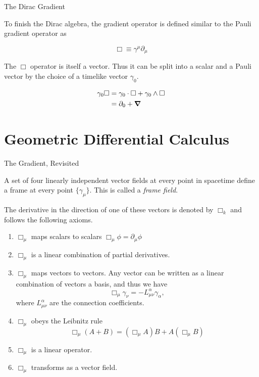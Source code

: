\documentclass{beamer}
\begin{document}
\begin{frame}{The Dirac Gradient}

To finish the Dirac algebra, the gradient operator is defined similar to the Pauli gradient operator as

\begin{equation}
	\Box \equiv \gamma^\mu\partial_\mu
\end{equation}

\pause

The $\Box$ operator is itself a vector. Thus it can be split into a scalar and a Pauli vector by the choice of a timelike vector $\gamma_0$.

\begin{align*}
	\gamma_0\Box &= \gamma_0\cdot \Box + \gamma_0 \wedge \Box \\
	&= \partial_0 + \grad
\end{align*}

\end{frame}


\section{Geometric Differential Calculus}

\begin{frame}[allowframebreaks]{The Gradient, Revisited}

A set of four linearly independent vector fields at every point in spacetime define a frame at every point $\{\gamma_\mu\}$. This is called a \emph{frame field}.

The derivative in the direction of one of these vectors is denoted by $\Box_k$ and follows the following axioms.

\begin{enumerate}
	\item $\Box_\mu$ maps scalars to scalars $\Box_\mu \phi = \partial_\mu \phi$
	\item $\Box_\mu$ is a linear combination of partial derivatives.
	\item $\Box_\mu$ maps vectors to vectors. Any vector can be written as a linear combination of vectors a basis, and thus we have
	\begin{equation*}
		\Box_\mu\gamma_\nu = -L^\alpha_{\mu\nu}\gamma_\alpha,
	\end{equation*}
	where $L^\alpha_{\mu\nu}$ are the connection coefficients.
	\item $\Box_\mu$ obeys the Leibnitz rule
	\begin{equation*}
		\Box_\mu (A+B) = (\Box_\mu A)B + A(\Box_\mu B)
	\end{equation*}
	\item $\Box_\mu$ is a linear operator.
	\item $\Box_\mu$ transforms as a vector field.
\end{enumerate}

\end{frame}
\end{document}

